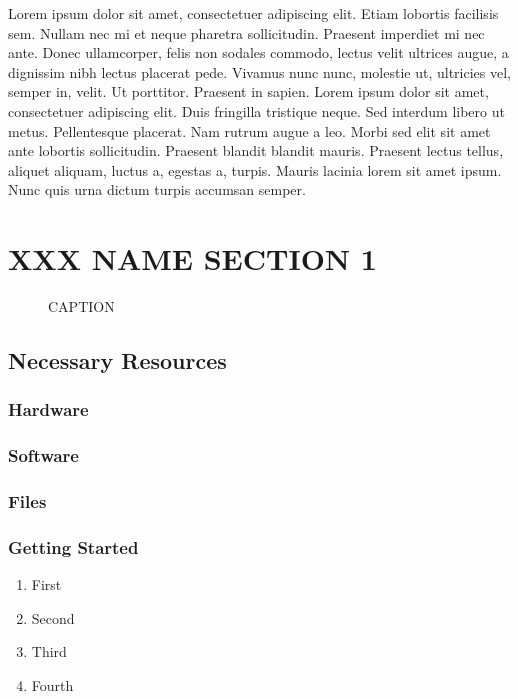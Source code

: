 Lorem ipsum dolor sit amet, consectetuer adipiscing elit. Etiam lobortis facilisis sem. Nullam nec mi et neque pharetra sollicitudin. Praesent imperdiet mi nec ante. Donec ullamcorper, felis non sodales commodo, lectus velit ultrices augue, a dignissim nibh lectus placerat pede. Vivamus nunc nunc, molestie ut, ultricies vel, semper in, velit. Ut porttitor. Praesent in sapien. Lorem ipsum dolor sit amet, consectetuer adipiscing elit. Duis fringilla tristique neque. Sed interdum libero ut metus. Pellentesque placerat. Nam rutrum augue a leo. Morbi sed elit sit amet ante lobortis sollicitudin. Praesent blandit blandit mauris. Praesent lectus tellus, aliquet aliquam, luctus a, egestas a, turpis. Mauris lacinia lorem sit amet ipsum. Nunc quis urna dictum turpis accumsan semper.



\section{XXX NAME SECTION 1}\label{section1}


\begin{figure}[h!]
\centering
\caption{\small 
	CAPTION
}
\label{fig:fig1}
\end{figure}

\subsection*{Necessary Resources}

\subsubsection*{Hardware}

\subsubsection*{Software}

\subsubsection*{Files}

\subsubsection*{Getting Started}
\begin{enumerate}
   \item First
   \item Second
   \item Third
   \item Fourth
\end{enumerate}

